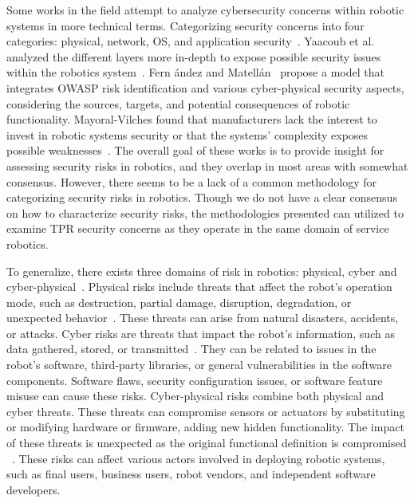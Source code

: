 Some works in the field attempt to analyze cybersecurity concerns within robotic
systems in more technical terms. Categorizing security concerns into four categories: physical, network, OS, and
application security~\cite[5]{robot_security_framework_2018}. Yaacoub et al. analyzed the different layers more in-depth to expose possible security issues within the robotics system~\cite[]{robotics_cyber_security_2022}. Fern
ández and
Matellán~\cite[
  76]{cyber_sec_robotics_privacy_safety_2017} propose a model that
integrates \ac{OWASP} risk identification and various cyber-physical security aspects, considering the sources, targets, and potential consequences of robotic functionality. Mayoral-Vilches found that manufacturers lack the interest to invest in robotic systems security or that the systems' complexity exposes possible weaknesses~\cite[]{robot_security_review_2022}. The overall goal of these works is to provide insight for assessing security risks in robotics, and they overlap in most areas with somewhat consensus. However, there seems to be a lack of a common methodology for categorizing security risks in robotics. Though we do not have a clear consensus on how to characterize security risks, the methodologies presented can utilized to examine \ac{TPR} security concerns as they operate in the
same domain of service robotics.

To generalize, there exists three domains of risk in robotics:
physical, cyber and cyber-physical~\cite[]{cyber_sec_robotics_privacy_safety_2017}.
Physical risks include threats that affect the robot's operation mode, such as destruction, partial damage, disruption, degradation, or
unexpected behavior~\cite[77]{cyber_sec_robotics_privacy_safety_2017}. These threats can arise from natural disasters, accidents, or
attacks. Cyber risks are threats that impact the robot's information, such as data gathered, stored, or transmitted~\cite[78]{
  cyber_sec_robotics_privacy_safety_2017}. They can be related to issues in the robot's software, third-party libraries, or general vulnerabilities in the software components. Software flaws, security configuration issues, or software feature misuse can cause these risks.
Cyber-physical risks combine both physical and cyber threats. These threats can compromise sensors or actuators by substituting or
modifying hardware or firmware, adding new hidden functionality.
The impact of these threats is unexpected as the original functional
definition is compromised ~\cite[77-78]{cyber_sec_robotics_privacy_safety_2017}. These risks can affect various actors involved in deploying robotic systems, such as final users, business users, robot vendors, and independent software developers.

